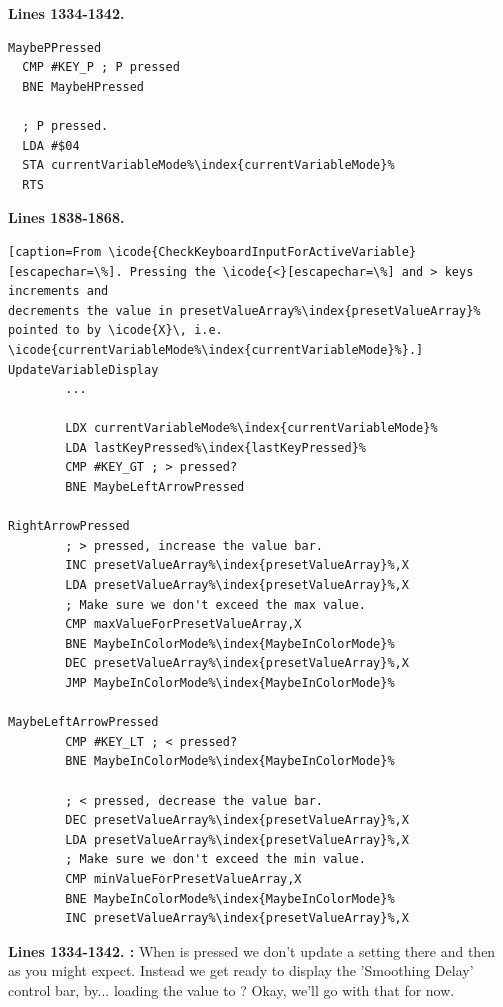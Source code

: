 \clearpage
\textbf{Lines 1334-1342. } 
\begin{lstlisting}[caption=From \icode{CheckKeyboardInput\index{CheckKeyboardInput}}.,escapechar=\%]
MaybePPressed   
  CMP #KEY_P ; P pressed
  BNE MaybeHPressed

  ; P pressed.
  LDA #$04
  STA currentVariableMode%\index{currentVariableMode}%
  RTS 
\end{lstlisting}
\textbf{Lines 1838-1868. } 
\begin{lstlisting}[escapechar=\%][caption=From \icode{CheckKeyboardInputForActiveVariable}[escapechar=\%]. Pressing the \icode{<}[escapechar=\%] and > keys increments and
decrements the value in presetValueArray%\index{presetValueArray}% pointed to by \icode{X}\, i.e. \icode{currentVariableMode%\index{currentVariableMode}%}.]
UpdateVariableDisplay   
        ...

        LDX currentVariableMode%\index{currentVariableMode}%
        LDA lastKeyPressed%\index{lastKeyPressed}%
        CMP #KEY_GT ; > pressed?
        BNE MaybeLeftArrowPressed

RightArrowPressed
        ; > pressed, increase the value bar.
        INC presetValueArray%\index{presetValueArray}%,X
        LDA presetValueArray%\index{presetValueArray}%,X
        ; Make sure we don't exceed the max value.
        CMP maxValueForPresetValueArray,X
        BNE MaybeInColorMode%\index{MaybeInColorMode}%
        DEC presetValueArray%\index{presetValueArray}%,X
        JMP MaybeInColorMode%\index{MaybeInColorMode}%

MaybeLeftArrowPressed   
        CMP #KEY_LT ; < pressed?
        BNE MaybeInColorMode%\index{MaybeInColorMode}%

        ; < pressed, decrease the value bar.
        DEC presetValueArray%\index{presetValueArray}%,X
        LDA presetValueArray%\index{presetValueArray}%,X
        ; Make sure we don't exceed the min value.
        CMP minValueForPresetValueArray,X
        BNE MaybeInColorMode%\index{MaybeInColorMode}%
        INC presetValueArray%\index{presetValueArray}%,X
\end{lstlisting}
\clearpage
{}
\textbf{Lines 1334-1342. :} When  is pressed we don't
update a setting there and then as you might expect. Instead we get ready to display the 'Smoothing
Delay' control bar, by... loading the value  to ? Okay, we'll
go with that for now.

